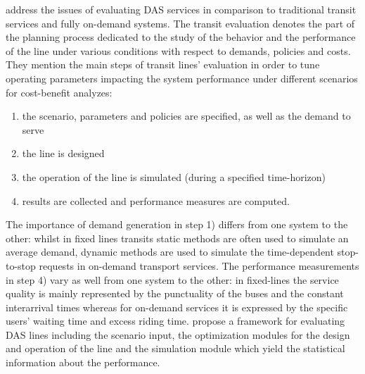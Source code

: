 \documentclass[12pt,a4paper]{article}
\begin{document}
\cite{evaluation} address the issues of evaluating DAS services in comparison to traditional transit services and fully on-demand systems. The transit evaluation denotes the part of the planning process dedicated to the study of the behavior and the performance of the line under various conditions with respect to demands, policies and costs. They mention the main steps of transit lines' evaluation in order to tune operating parameters impacting the system performance under different scenarios for cost-benefit analyzes: 
\begin{enumerate}
\setlength\itemsep{1pt}
\item the scenario, parameters and policies are specified, as well as the demand to serve
\item the line is designed
\item the operation of the line is simulated (during a specified time-horizon)
\item results are collected and performance measures are computed. 
\end{enumerate}
The importance of demand generation in step 1) differs from one system to the other: whilst in fixed lines transits static methods are often used to simulate an average demand, dynamic methods are used to simulate the time-dependent stop-to-stop requests in on-demand transport services. The performance measurements in step 4) vary as well from one system to the other: in fixed-lines the service quality is mainly represented by the punctuality of the buses and the constant interarrival times whereas for on-demand services it is expressed by the specific users' waiting time and excess riding time. \cite{evaluation} propose a framework for evaluating DAS lines including the scenario input, the optimization modules for the design and operation of the line and the simulation module which yield the statistical information about the performance.
\end{document}
